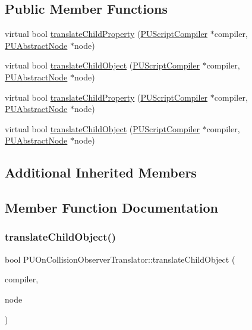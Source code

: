 \subsection*{Public Member Functions}
\begin{DoxyCompactItemize}
\item 
virtual bool \hyperlink{classPUOnCollisionObserverTranslator_a73ceba39e5459d966ac3561f968d70b7}{translate\+Child\+Property} (\hyperlink{classPUScriptCompiler}{P\+U\+Script\+Compiler} $\ast$compiler, \hyperlink{classPUAbstractNode}{P\+U\+Abstract\+Node} $\ast$node)
\item 
virtual bool \hyperlink{classPUOnCollisionObserverTranslator_a3bcf455e908fe8251cba029847abad11}{translate\+Child\+Object} (\hyperlink{classPUScriptCompiler}{P\+U\+Script\+Compiler} $\ast$compiler, \hyperlink{classPUAbstractNode}{P\+U\+Abstract\+Node} $\ast$node)
\item 
virtual bool \hyperlink{classPUOnCollisionObserverTranslator_a6fa0903778981fe103e04cc9e283b5ba}{translate\+Child\+Property} (\hyperlink{classPUScriptCompiler}{P\+U\+Script\+Compiler} $\ast$compiler, \hyperlink{classPUAbstractNode}{P\+U\+Abstract\+Node} $\ast$node)
\item 
virtual bool \hyperlink{classPUOnCollisionObserverTranslator_a66a7eeb07344341aaafacf9045d5b16b}{translate\+Child\+Object} (\hyperlink{classPUScriptCompiler}{P\+U\+Script\+Compiler} $\ast$compiler, \hyperlink{classPUAbstractNode}{P\+U\+Abstract\+Node} $\ast$node)
\end{DoxyCompactItemize}
\subsection*{Additional Inherited Members}


\subsection{Member Function Documentation}
\mbox{\label{classPUOnCollisionObserverTranslator_a3bcf455e908fe8251cba029847abad11}} 
\subsubsection{\texorpdfstring{translate\+Child\+Object()}{translateChildObject()}\hspace{0.1cm}{\footnotesize\ttfamily [1/2]}}
{\footnotesize\ttfamily bool P\+U\+On\+Collision\+Observer\+Translator\+::translate\+Child\+Object (\begin{DoxyParamCaption}\item[{\hyperlink{classPUScriptCompiler}{P\+U\+Script\+Compiler} $\ast$}]{compiler,  }\item[{\hyperlink{classPUAbstractNode}{P\+U\+Abstract\+Node} $\ast$}]{node }\end{DoxyParamCaption})\hspace{0.3cm}{\ttfamily [virtual]}}

